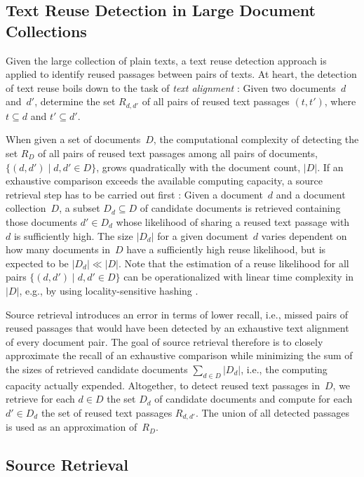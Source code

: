 \subsection*{Text Reuse Detection in Large Document Collections}

Given the large collection of plain texts, a text reuse detection approach is applied  to identify reused passages between pairs of texts. At heart, the detection of text reuse boils down to the task of {\em text alignment} \cite{potthast:2013e}: Given two documents~$d$ and~$d'$, determine the set $R_{d,d'}$ of all pairs of reused text passages $(t, t')$, where $t\subseteq d$ and $t' \subseteq d'$. 

When given a set of documents~$D$, the computational complexity of detecting the set $R_D$ of all pairs of reused text passages among all pairs of documents, $\{(d, d')\mid d, d'\in D\}$, grows quadratically with the document count, {$|D|$}. If an exhaustive comparison exceeds the available computing capacity, a source retrieval step has to be carried out first \cite{hagen:2015e,hagen:2017e}: Given a document~$d$ and a document collection~$D$, a subset $D_d\subseteq D$ of candidate documents is retrieved containing those documents $d'\in D_d$ whose likelihood of sharing a reused text passage with~$d$ is sufficiently high. The size $|D_d|$ for a given document~$d$ varies dependent on how many documents in~$D$ have a sufficiently high reuse likelihood, but is expected to be $|D_d| \ll |D|$. Note that the estimation of a reuse likelihood for all pairs $\{(d, d')\mid d, d'\in D\}$ can be operationalized with linear time complexity in~$|D|$, e.g., by using locality-sensitive hashing \cite{stein:2019c}.

Source retrieval introduces an error in terms of lower recall, i.e., missed pairs of reused passages that would have been detected by an exhaustive text alignment of every document pair. The goal of source retrieval therefore is to closely approximate the recall of an exhaustive comparison while minimizing the sum of the sizes of retrieved candidate documents $\sum_{d\in D} |D_d|$, i.e., the computing capacity actually expended. Altogether, to detect reused text passages in~$D$, we retrieve for each $d \in D$ the set $D_d$ of candidate documents and compute for each $d'\in D_d$ the set of reused text passages $R_{d,d'}$. The union of all detected passages is used as an approximation of~$R_D$.



\subsection*{Source Retrieval}

